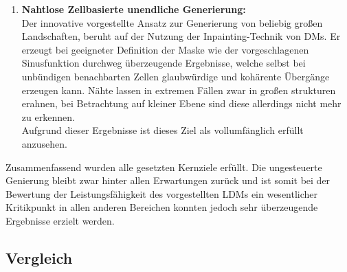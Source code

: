 \begin{enumerate}
    \item \textbf {Nahtlose Zellbasierte unendliche Generierung:} \\
    Der innovative vorgestellte Ansatz zur Generierung von beliebig großen Landschaften, beruht auf der Nutzung der Inpainting-Technik von \ac{DM}s. Er erzeugt bei geeigneter Definition der Maske wie der vorgeschlagenen Sinusfunktion durchweg überzeugende Ergebnisse, welche selbst bei unbündigen benachbarten Zellen glaubwürdige und kohärente Übergänge erzeugen kann. Nähte lassen in extremen Fällen zwar in großen strukturen erahnen, bei Betrachtung auf kleiner Ebene sind diese allerdings nicht mehr zu erkennen. \\
    Aufgrund dieser Ergebnisse ist dieses Ziel als vollumfänglich erfüllt anzusehen.     

\end{enumerate}
Zusammenfassend wurden alle gesetzten Kernziele erfüllt. Die ungesteuerte Genierung bleibt zwar hinter allen Erwartungen zurück und ist somit bei der Bewertung der Leistungsfähigkeit des vorgestellten \ac{LDM}s ein wesentlicher Kritikpunkt in allen anderen Bereichen konnten jedoch sehr überzeugende Ergebnisse erzielt werden. 
 
\subsection{Vergleich}

